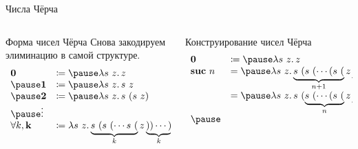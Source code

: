     \begin{frame}{Числа Чёрча}
        \vspace{-0.5em}
        \begin{columns}[onlytextwidth]
            \begin{column}{0.385\textwidth}
                \begin{block}{Форма чисел Чёрча}
                    Снова закодируем элиминацию в самой структуре.
                    \[
                        \begin{array}{l l}
                            \term{0}            & \termdef \pause \lambda s~z\ldotp z                                                  \\ \pause
                            \term{1}            & \termdef \pause \lambda s~z\ldotp s~z                                                \\ \pause
                            \term{2}            & \termdef \pause \lambda s~z\ldotp s~(s~z)                                            \\ \pause
                            \vdots \\
                            \forall k, \term{k} & \termdef \lambda s~z\ldotp\underbrace{s~(s~( \cdots s~(}_k z\underbrace{))\cdots)}_k \\
                        \end{array}
                    \]
                \end{block}
            \end{column}\hfill
            \pause%
            \begin{column}{0.585\textwidth}
                \begin{block}{Конструирование чисел Чёрча}
                    \vspace{-1em}
                    \[
                        \begin{array}{l l}
                            \term{0} & \termdef \pause \lambda s~z\ldotp z                                                             \\
                            \term{suc} \ap n
                            & = \pause \lambda s~z\ldotp \underbrace{s~(s~(\cdots (s~(}_{n+1} z\underbrace{)\cdots ))}_{n+1}  \\
                            & = \pause \lambda s~z\ldotp s~(\underbrace{s~(\cdots (s~(}_n z\underbrace{)\cdots )}_n)
                            = \pause \lambda s~z\ldotp s~(n~s~z) \\ \pause

\end{array}\]
\end{block}
\end{column}
\end{columns}
\end{frame}
